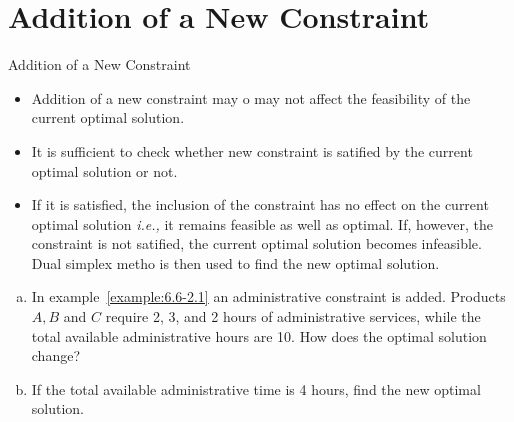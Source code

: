 
\section{Addition of a New Constraint}
\label{sec:addition-new-constraint}

\begin{frame}{Addition of a New Constraint}
  \begin{itemize} \justifying \parskip4mm
  \item Addition of a new constraint may o may not affect the feasibility of the current optimal solution.
  \item It is sufficient to check whether new constraint is satified by the current optimal solution or not.
  \item If it is satisfied, the inclusion of the constraint has no effect on the current optimal solution \emph{i.e.,} it remains feasible as well as optimal. If, however, the constraint is not satified, the current \alert{optimal solution becomes infeasible. Dual simplex metho is then used to find the new optimal solution.}
  \end{itemize}
\end{frame}

\begin{frameExample}{\label{example:6.6-5.1}}{}
  \begin{enumerate}[a)] \justifying \parskip4mm
  \item In example~\ref{example:6.6-2.1} an administrative constraint is added. Products $A, B$ and $C$ require 2, 3, and 2 hours of administrative services, while the total available administrative hours are 10. How does the optimal solution change?
  \item \label{example08} If the total available administrative time is 4 hours, find the new optimal solution.
  \end{enumerate}
\end{frameExample}

